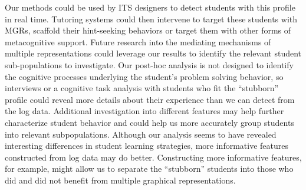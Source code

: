 \documentclass{edm_template}
\begin{document}
Our methods could be used by ITS designers to detect students with this profile in real time. Tutoring systems could then intervene to target these students with MGRs, scaffold their hint-seeking behaviors or target them with other forms of metacognitive support. Future research into  the mediating mechanisms of multiple representations could leverage our results to identify the relevant student sub-populations to investigate. Our post-hoc analysis is not designed to identify the cognitive processes underlying the student's problem solving behavior, so interviews or a cognitive task analysis with students who fit the ``stubborn'' profile could reveal more details about their experience than we can detect from the log data. Additional investigation into different features may help further characterize student behavior and could help us more accurately group students into relevant subpopulations. Although our analysis seems to have revealed interesting differences in student learning strategies, more informative features constructed from log data may do better. Constructing more informative features, for example, might allow us to separate the ``stubborn'' students into those who did and did not benefit from multiple graphical representations. 




\balancecolumns
\end{document}

